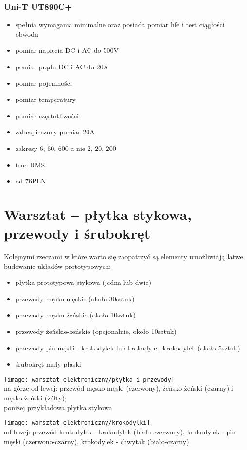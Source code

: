 \documentclass{pdfBooklets}
\newcommand\zaleta{\item[\textbf{\ttfamily +}]}
\newcommand\info{\item[\textbf{\ttfamily *}]}
\begin{document}
	\subsubsection{Uni-T UT890C+}
		\begin{itemize}
			\zaleta spełnia wymagania minimalne oraz posiada pomiar hfe i test ciągłości obwodu
			\zaleta pomiar napięcia DC i AC do 500V
			\zaleta pomiar prądu DC i AC do 20A
			\zaleta pomiar pojemności
			\zaleta pomiar temperatury
			\zaleta pomiar częstotliwości
			\zaleta zabezpieczony pomiar 20A
			\zaleta zakresy 6, 60, 600 a nie 2, 20, 200
			\zaleta true RMS
			\info od 76PLN
		\end{itemize}

\section{Warsztat – płytka stykowa, przewody i śrubokręt}
	Kolejnymi rzeczami w które warto się zaopatrzyć są elementy umożliwiają łatwe budowanie układów prototypowych:
	\begin{itemize}
		\item płytka prototypowa stykowa (jedna lub dwie)
		\item przewody męsko-męskie (około 30sztuk)
		\item przewody męsko-żeńskie (około 10sztuk)
		\item przewody żeńskie-żeńskie (opcjonalnie, około 10sztuk)
		\item przewody pin męski - krokodylek lub krokodylek-krokodylek (około 5sztuk)
		\item śrubokręt mały płaski
	\end{itemize}
	
	\vspace{12pt}
		\parbox[c]{0.45\textwidth}{
			\texttt{[image: warsztat\_elektroniczny/płytka\_i\_przewody]}\footnotesize
			\\na górze od lewej: przewód męsko-męski (czerwony), żeńsko-żeński (czarny) i męsko-żeński (żółty);
			\\poniżej przykładowa płytka stykowa
		}
		\parbox[c]{0.45\textwidth}{
			\texttt{[image: warsztat\_elektroniczny/krokodylki]}\footnotesize
			\\od lewej: przewód krokodylek - krokodylek (biało-czerwony), krokodylek - pin męski (czerwono-czarny), krokodylek - chwytak (biało-czarny)
		}
	\vspace{12pt}
	
\end{document}

